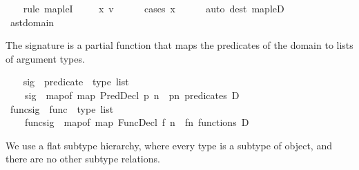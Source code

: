 \begin{isabellebody}
%
\isadelimproof
\ \ %
\endisadelimproof
%
\isatagproof
{}\isamarkupfalse%
\ {\isacharparenleft}{\kern0pt}rule\ map{\isacharunderscore}{\kern0pt}leI{\isacharparenright}{\kern0pt}\isanewline
\ \ \isamarkupfalse%
\ \ x\ v\isanewline
\ \ \ \ \isamarkupfalse%
\ {\isacharparenleft}{\kern0pt}cases\ x{\isacharparenright}{\kern0pt}\isanewline
\ \ \ \ \isamarkupfalse%
\ {\isacharparenleft}{\kern0pt}auto\ dest{\isacharcolon}{\kern0pt}\ map{\isacharunderscore}{\kern0pt}leD{\isacharparenright}{\kern0pt}\isanewline
\ \ \ \ \isamarkupfalse%
\isanewline
\ \ \isamarkupfalse%
%
\endisatagproof
{\isafoldproof}%
%
\isadelimproof
\isanewline
%
\endisadelimproof
\isanewline
\isanewline
{}\isamarkupfalse%
\ ast{\isacharunderscore}{\kern0pt}domain\ %
\begin{isamarkuptext}%
The signature is a partial function that maps the predicates
    of the domain to lists of argument types.%
\end{isamarkuptext}\isamarkuptrue%
\ \ \isamarkupfalse%
\ sig\ {\isacharcolon}{\kern0pt}{\isacharcolon}{\kern0pt}\ {\isachardoublequoteopen}predicate\ {\isasymrightharpoonup}\ type\ list{\isachardoublequoteclose}\ \isanewline
\ \ \ \ {\isachardoublequoteopen}sig\ {\isasymequiv}\ map{\isacharunderscore}{\kern0pt}of\ {\isacharparenleft}{\kern0pt}map\ {\isacharparenleft}{\kern0pt}{\isasymlambda}PredDecl\ p\ n\ {\isasymRightarrow}\ {\isacharparenleft}{\kern0pt}p{\isacharcomma}{\kern0pt}n{\isacharparenright}{\kern0pt}{\isacharparenright}{\kern0pt}\ {\isacharparenleft}{\kern0pt}predicates\ D{\isacharparenright}{\kern0pt}{\isacharparenright}{\kern0pt}{\isachardoublequoteclose}\isanewline
\isanewline
\ \ \isamarkupfalse%
\ func{\isacharunderscore}{\kern0pt}sig\ {\isacharcolon}{\kern0pt}{\isacharcolon}{\kern0pt}\ {\isachardoublequoteopen}func\ {\isasymrightharpoonup}\ type\ list{\isachardoublequoteclose}\ \isanewline
\ \ \ \ {\isachardoublequoteopen}func{\isacharunderscore}{\kern0pt}sig\ {\isasymequiv}\ map{\isacharunderscore}{\kern0pt}of\ {\isacharparenleft}{\kern0pt}map\ {\isacharparenleft}{\kern0pt}{\isasymlambda}FuncDecl\ f\ n\ {\isasymRightarrow}\ {\isacharparenleft}{\kern0pt}f{\isacharcomma}{\kern0pt}n{\isacharparenright}{\kern0pt}{\isacharparenright}{\kern0pt}\ {\isacharparenleft}{\kern0pt}functions\ D{\isacharparenright}{\kern0pt}{\isacharparenright}{\kern0pt}{\isachardoublequoteclose}%
\begin{isamarkuptext}%
We use a flat subtype hierarchy, where every type is a subtype
    of object, and there are no other subtype relations.


\end{isamarkuptext}
\end{isabellebody}
